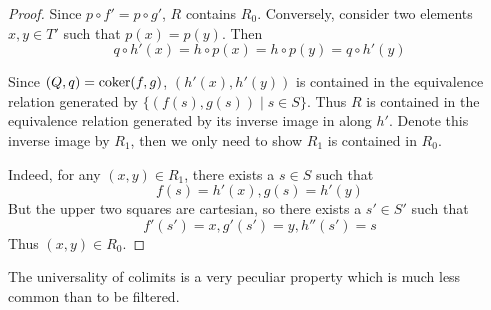 \begin{proof}
    Since $p\circ f' = p\circ g'$, $R$ contains $R_0$.
    Conversely, consider two elements $x,y\in T'$ such that $p(x)=p(y)$. Then
    \begin{equation*}
      q\circ h' (x) = h\circ p (x) = h\circ p (y) = q\circ h'(y)
    \end{equation*}

    Since $(Q,q)=\operatorname{coker}(f,g)$, $(h' (x),h' (y))$ is contained in the equivalence relation generated by $\{(f(s),g(s))\mid s\in S\}$.
    Thus $R$ is contained in the equivalence relation generated by its inverse image in along $h'$. Denote this inverse image by $R_1$, then we only need to show $R_1$ is contained in $R_0$.

    Indeed, for any $(x,y)\in R_1$, there exists a $s\in S$ such that
    \begin{equation*}
      f(s)=h' (x),g(s)=h' (y)
    \end{equation*}
    But the upper two squares are cartesian, so there exists a $s'\in S'$ such that
    \begin{equation*}
      f'(s')=x,g'(s')=y,h''(s')=s
    \end{equation*}
    Thus $(x,y)\in R_0$.
  \end{proof}
  The universality of colimits is a very peculiar property which is much less common than to be filtered.



